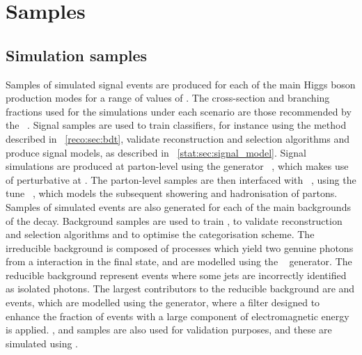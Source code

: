 






\section{Samples}
\label{reco:sec:samples}
\subsection{Simulation samples}

Samples of simulated signal events are produced for each of the main Higgs boson production modes for a range of values of \mH. The cross-section and branching fractions used for the simulations under each \mH scenario are those recommended by the \LHCHXSWG~\cite{LHCHXSWGYR4}. Signal samples are used to train \MVA classifiers, for instance using the \BDT method described in \Sec~\ref{reco:sec:bdt}, validate reconstruction and selection algorithms and produce signal models, as described in \Sec~\ref{stat:sec:signal_model}. Signal simulations are produced at parton-level using the generator \Madgraph~\cite{Madgraph}, which makes use of perturbative \QCD at \NLO. The parton-level samples are then interfaced with \Pythia~\cite{Pythia8}, using the tune \PythiaTune~\cite{PythiaTune}, which models the subsequent showering and hadronisation of partons. 
Samples of simulated events are also generated for each of the main backgrounds of the \Hgg decay. Background samples are used to train \BDT\s, to validate reconstruction and selection algorithms and to optimise the categorisation scheme. The irreducible background is composed of \SM processes which yield two genuine photons from a \pp interaction in the final state, and are modelled using the \Sherpa~\cite{Sherpa} generator. The reducible background represent events where some jets are incorrectly identified as isolated photons. The largest contributors to the reducible background are \gammaJet and \QCDmultijet events, which are modelled using the \Pythia generator, where a filter designed to enhance the fraction of events with a large component of electromagnetic energy is applied. %
\DY, \Wg and \Zg samples are also used for validation purposes, and these are simulated using \Madgraph. 

